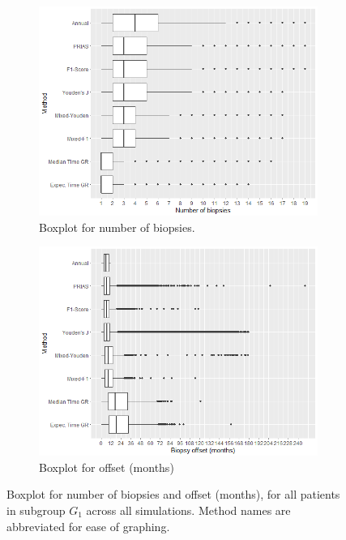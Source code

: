 \begin{figure}[!htb]
    \centering
    \captionsetup{justification=centering}
     \begin{subfigure}[b]{0.45\textwidth}
        \includegraphics[width=\textwidth]{images/sim_study/nbBoxPlot_scale_4.png}
        \caption{Boxplot for number of biopsies.}
        \label{fig : nbBoxPlot_G1}
    \end{subfigure}
    \begin{subfigure}[b]{0.45\textwidth}
        \includegraphics[width=\textwidth]{images/sim_study/offsetBoxPlot_scale_4.png}
        \caption{Boxplot for offset (months)}
        \label{fig : offsetBoxPlot_G1}
    \end{subfigure}      
    \caption{Boxplot for number of biopsies and offset (months), for all patients in subgroup $G_1$ across all simulations. Method names are abbreviated for ease of graphing.}
    \label{fig : nbAndOffsetBoxPlot_G1}
\end{figure}

